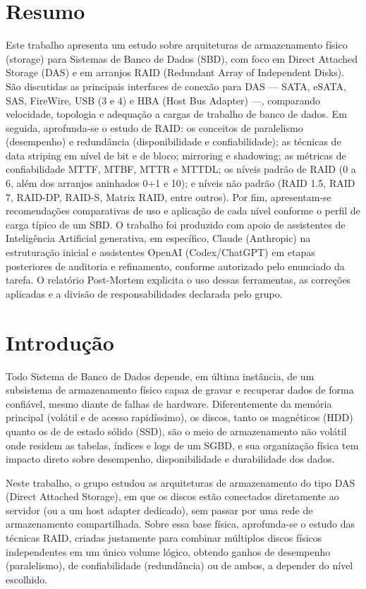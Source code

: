 \documentclass[11pt,a4paper]{article}
\begin{document}
\section{Resumo}
Este trabalho apresenta um estudo sobre arquiteturas de armazenamento físico (storage) para Sistemas de Banco de Dados (SBD), com foco em Direct Attached Storage (DAS) e em arranjos RAID (Redundant Array of Independent Disks). São discutidas as principais interfaces de conexão para DAS --- SATA, eSATA, SAS, FireWire, USB (3 e 4) e HBA (Host Bus Adapter) ---, comparando velocidade, topologia e adequação a cargas de trabalho de banco de dados. Em seguida, aprofunda-se o estudo de RAID: os conceitos de paralelismo (desempenho) e redundância (disponibilidade e confiabilidade); as técnicas de data striping em nível de bit e de bloco; mirroring e shadowing; as métricas de confiabilidade MTTF, MTBF, MTTR e MTTDL; os níveis padrão de RAID (0 a 6, além dos arranjos aninhados 0+1 e 10); e níveis não padrão (RAID 1.5, RAID 7, RAID-DP, RAID-S, Matrix RAID, entre outros). Por fim, apresentam-se recomendações comparativas de uso e aplicação de cada nível conforme o perfil de carga típico de um SBD. O trabalho foi produzido com apoio de assistentes de Inteligência Artificial generativa, em específico, Claude (Anthropic) na estruturação inicial e assistentes OpenAI (Codex/ChatGPT) em etapas posteriores de auditoria e refinamento, conforme autorizado pelo enunciado da tarefa. O relatório Post-Mortem explicita o uso dessas ferramentas, as correções aplicadas e a divisão de responsabilidades declarada pelo grupo.

\section{Introdução}
Todo Sistema de Banco de Dados depende, em última instância, de um subsistema de armazenamento físico capaz de gravar e recuperar dados de forma confiável, mesmo diante de falhas de hardware. Diferentemente da memória principal (volátil e de acesso rapidíssimo), os discos, tanto os magnéticos (HDD) quanto os de de estado sólido (SSD), são o meio de armazenamento não volátil onde residem as tabelas, índices e logs de um SGBD, e sua organização física tem impacto direto sobre desempenho, disponibilidade e durabilidade dos dados.

Neste trabalho, o grupo estudou as arquiteturas de armazenamento do tipo DAS (Direct Attached Storage), em que os discos estão conectados diretamente ao servidor (ou a um host adapter dedicado), sem passar por uma rede de armazenamento compartilhada. Sobre essa base física, aprofunda-se o estudo das técnicas RAID, criadas justamente para combinar múltiplos discos físicos independentes em um único volume lógico, obtendo ganhos de desempenho (paralelismo), de confiabilidade (redundância) ou de ambos, a depender do nível escolhido.
\end{document}
